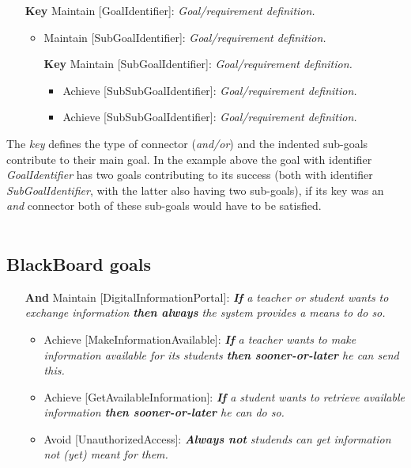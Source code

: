 \begin{itemize}
	\item[\textbf{Key}] Maintain [GoalIdentifier]:
	\emph{Goal/requirement definition.}
	
	\begin{itemize}
		\item Maintain [SubGoalIdentifier]:		
		\emph{Goal/requirement definition.}
		
		\item[\textbf{Key}] Maintain [SubGoalIdentifier]:	
		\emph{Goal/requirement definition.}
		
		\begin{itemize}
			\item Achieve [SubSubGoalIdentifier]:		
			\emph{Goal/requirement definition.}
			
			\item Achieve [SubSubGoalIdentifier]:	
			\emph{Goal/requirement definition.}
		\end{itemize}
	\end{itemize}
\end{itemize}

The \emph{key} defines the type of connector (\emph{and/or}) and the indented sub-goals contribute to their main goal. In the example above the goal with identifier \emph{GoalIdentifier} has two goals contributing to its success (both with identifier \emph{SubGoalIdentifier}, with the latter also having two sub-goals), if its key was an \emph{and} connector both of these sub-goals would have to be satisfied.\\\\ 


\subsection*{BlackBoard goals}

\begin{itemize}
	\item[\textbf{And}] Maintain [DigitalInformationPortal]:
	\emph{\textbf{If} a teacher or student wants to exchange information \textbf{then always} the system provides a means to do so.}
	
	\begin{itemize}
		\item Achieve [MakeInformationAvailable]:		
		\emph{\textbf{If} a teacher wants to make information available for its students \textbf{then sooner-or-later} he can send this.}
		
		\item Achieve [GetAvailableInformation]:
		\emph{\textbf{If} a student wants to retrieve available information \textbf{then sooner-or-later} he can do so.}
		
		\item Avoid [UnauthorizedAccess]:
		\emph{\textbf{Always not} studends can get information not (yet) meant for them.}
	\end{itemize}
\end{itemize}


